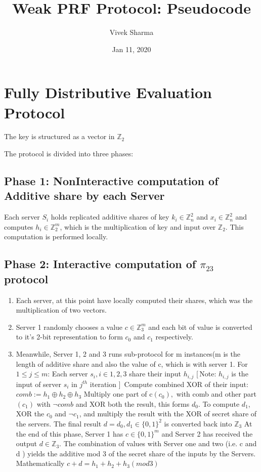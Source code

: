 \documentclass[11pt]{article}
\title{Weak PRF Protocol: Pseudocode}
\author{Vivek Sharma}
\date{Jan 11, 2020}
\begin{document}
\maketitle


\section{Fully Distributive Evaluation Protocol}
The key is structured as a vector in $\mathbb{Z}_2$


The protocol is divided into three phases:

\subsection{Phase 1: NonInteractive computation of Additive share by each Server} 
Each server $S_{i}$ holds replicated additive shares of key $k_{i} \in \mathbb{Z}_{n}^{2}$ and $x_{i} \in \mathbb{Z}_{n}^{2}$ and computes $h_{i} \in \mathbb{Z}_{2}^{m}$, which is the multiplication of key and input over $\mathbb{Z}_2$. This computation is performed locally. 
\subsection{Phase 2: Interactive computation of $\pi_{23}$ protocol}

\begin{enumerate}
	\item Each server, at this point have locally computed their shares, which was the multiplication of two vectors.
	\item Server 1 randomly chooses a value $c \in \mathbb{Z}_{3}^{m}$ and each bit of value is converted to it's 2-bit representation to form $c_{0}$ and $c_{1}$ respectively. 
	\item Meanwhile, Server 1, 2 and 3 runs sub-protocol for m instances(m is the length of additive share and also the value of c, which is with server 1.
	\subitem For $1 \leq j \leq m$:
	\subitem Each server $s_{i} , i \in {1,2,3}$ share their input $h_{i,j}$ [\,Note: $h_{i,j}$ is the input of server $s_{i}$ in $j^{th}$ iteration ]\,
	\subitem Compute combined XOR of their input: $comb := h_{1} \oplus h_{2} \oplus h_{3}$
	\subitem Multiply one part of c$(c_{0}),$ with comb and other part $(c_{1})$ with $\neg{comb}$ and XOR both the result, this forms $d_{0}$.
	\subitem To compute $d_{1}$, XOR the $c_{0}$ and $\neg{c_{1}}$, and multiply the result with the XOR of secret share of the servers.
	\subitem The final result $d = d_{0}, d_{1} \in \{ 0,1\}^{2}$ is converted back into $\mathbb{Z}_{3}$
	\subitem At the end of this phase, Server 1 has $c \in \{0,1\}^m$ and Server 2 has received the output $d \in \mathbb{Z}_{3}$. The combination of values with Server one and two (i.e. c and d ) yields the additive mod 3 of the secret share of the inputs by the Servers. Mathematically $c + d = h_{1} + h_{2} + h_{3} (mod 3)$
\end{enumerate}
\end{document}

